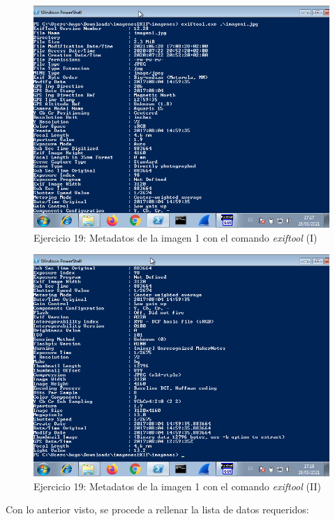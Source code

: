 \documentclass[11pt]{article}
\begin{document}
\begin{figure}[H]
    \caption{Ejercicio 19: Metadatos de la imagen 1 con el comando \textit{exiftool} (I)}
    \centering
    \includegraphics[scale=0.7]{p03/e19-3.png}
\end{figure}

\begin{figure}[H]
    \caption{Ejercicio 19: Metadatos de la imagen 1 con el comando \textit{exiftool} (II)}
    \centering
    \includegraphics[scale=0.7]{p03/e19-4.png}
\end{figure}

Con lo anterior visto, se procede a rellenar la lista de datos requeridos:
\end{document}
